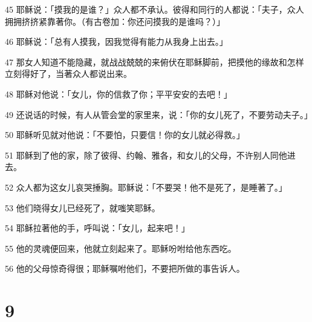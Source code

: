 \par 45 耶稣说：「摸我的是谁？」众人都不承认。彼得和同行的人都说：「夫子，众人拥拥挤挤紧靠著你。（有古卷加：你还问摸我的是谁吗？）」
\par 46 耶稣说：「总有人摸我，因我觉得有能力从我身上出去。」
\par 47 那女人知道不能隐藏，就战战兢兢的来俯伏在耶稣脚前，把摸他的缘故和怎样立刻得好了，当著众人都说出来。
\par 48 耶稣对他说：「女儿，你的信救了你；平平安安的去吧！」
\par 49 还说话的时候，有人从管会堂的家里来，说：「你的女儿死了，不要劳动夫子。」
\par 50 耶稣听见就对他说：「不要怕，只要信！你的女儿就必得救。」
\par 51 耶稣到了他的家，除了彼得、约翰、雅各，和女儿的父母，不许别人同他进去。
\par 52 众人都为这女儿哀哭捶胸。耶稣说：「不要哭！他不是死了，是睡著了。」
\par 53 他们晓得女儿已经死了，就嗤笑耶稣。
\par 54 耶稣拉著他的手，呼叫说：「女儿，起来吧！」
\par 55 他的灵魂便回来，他就立刻起来了。耶稣吩咐给他东西吃。
\par 56 他的父母惊奇得很；耶稣嘱咐他们，不要把所做的事告诉人。

\chapter{9}

